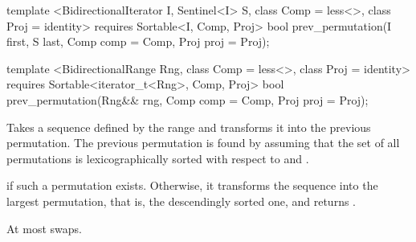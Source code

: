 %
\begin{itemdecl}
template <BidirectionalIterator I, Sentinel<I> S, class Comp = less<>,
    class Proj = identity>
  requires Sortable<I, Comp, Proj>
  bool prev_permutation(I first, S last, Comp comp = Comp{}, Proj proj = Proj{});

template <BidirectionalRange Rng, class Comp = less<>,
    class Proj = identity>
  requires Sortable<iterator_t<Rng>, Comp, Proj>
  bool
    prev_permutation(Rng&& rng, Comp comp = Comp{}, Proj proj = Proj{});
\end{itemdecl}

\begin{itemdescr}
\pnum
\effects
Takes a sequence defined by the range
and transforms it into the previous permutation.
The previous permutation is found by assuming that the set of all permutations is
lexicographically sorted with respect to
 and .

\pnum
\returns
{}
if such a permutation exists.
Otherwise, it transforms the sequence into the largest permutation,
that is, the descendingly sorted one, and returns
.

\pnum
\complexity
At most
swaps.
\end{itemdescr}
